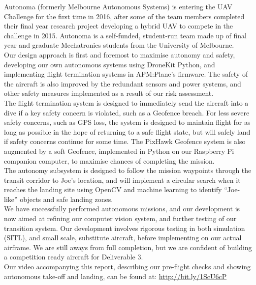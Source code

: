 Autonoma (formerly Melbourne Autonomous Systems) is entering the UAV Challenge for the first time in 2016, after some of the team members completed their final year research project developing a hybrid UAV to compete in the challenge in 2015. Autonoma is a self-funded, student-run team made up of final year and graduate Mechatronics students from the University of Melbourne.\\

Our design approach is first and foremost to maximise autonomy and safety, developing our own autonomous systems using DroneKit Python, and implementing flight termination systems in APM:Plane's firmware. The safety of the aircraft is also improved by the redundant sensors and power systems, and other safety measures implemented as a result of our risk assessment.\\

The flight termination system is designed to immediately send the aircraft into a dive if a key safety concern is violated, such as a Geofence breach. For less severe safety concerns, such as GPS loss, the system is designed to maintain flight for as long as possible in the hope of returning to a safe flight state, but will safely land if safety concerns continue for some time. The PixHawk Geofence system is also augmented by a soft Geofence, implemented in Python on our Raspberry Pi companion computer, to maximise chances of completing the mission.\\

The autonomy subsystem is designed to follow the mission waypoints through the transit corridor to Joe's location, and will implement a circular search when it reaches the landing site using OpenCV and machine learning to identify ``Joe-like'' objects and safe landing zones.\\

We have successfully performed autonomous missions, and our development is now aimed at refining our computer vision system, and further testing of our transition system. Our development involves rigorous testing in both simulation (SITL), and small scale, substitute aircraft, before implementing on our actual airframe. We are still aways from full completion, but we are confident of building a competition ready aircraft for Deliverable 3.\\

Our video accompanying this report, describing our pre-flight checks and showing autonomous take-off and landing, can be found at: \url{http://bit.ly/1ScU6cP}